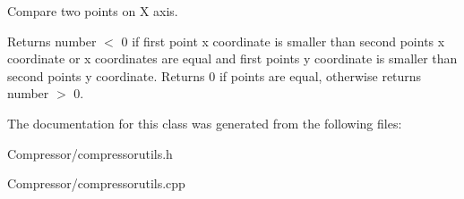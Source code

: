 Compare two points on X axis. 

Returns number $<$ 0 if first point x coordinate is smaller than second point\textquotesingle{}s x coordinate or x coordinates are equal and first point\textquotesingle{}s y coordinate is smaller than second point\textquotesingle{}s y coordinate. Returns 0 if points are equal, otherwise returns number $>$ 0. 

The documentation for this class was generated from the following files\+:\begin{DoxyCompactItemize}
\item 
Compressor/compressorutils.\+h\item 
Compressor/compressorutils.\+cpp\end{DoxyCompactItemize}
